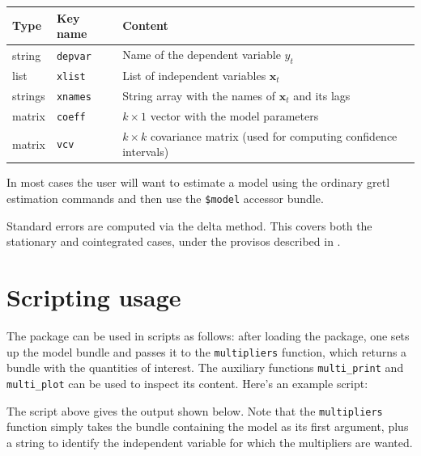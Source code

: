 \documentclass[a4paper,10pt]{article}
\newcommand{\xb}{\mathbf{x}}
\begin{document}
\medskip
\begin{center}
\begin{tabular}{llp{}}
  \hline
  \textbf{Type} & \textbf{Key name} & \textbf{Content} \\
  \hline
  string & \texttt{depvar} & Name of the dependent variable $y_t$ \\ 
  list & \texttt{xlist} & List of independent variables
                          $\xb_t$ \\ 
  strings & \texttt{xnames} & String array with the names of $\xb_t$
                              and its lags \\ 
  matrix & \texttt{coeff} & $k \times 1$ vector with the model parameters   \\ 
  matrix & \texttt{vcv} & $k \times k$ covariance matrix (used for
                          computing confidence intervals) \\
  \hline
\end{tabular}
\end{center}

\medskip

In most cases the user will want to estimate a model using the ordinary
gretl estimation commands and then use the \verb|$model| accessor bundle.

Standard errors are computed via the delta method. This covers both
the stationary and cointegrated cases, under the provisos described in
\cite{PesaranShin1998}.

\section{Scripting usage}
\label{sec:scripting}

The package can be used in scripts as follows: after loading the
package, one sets up the model bundle and passes it to the
\texttt{multipliers} function, which returns a bundle with the
quantities of interest. The auxiliary functions \texttt{multi\_print}
and \texttt{multi\_plot} can be used to inspect its content. Here's an
example script:

The script above gives the output shown below. Note that the
\texttt{multipliers} function simply takes the bundle containing the
model as its first argument, plus a string to identify the independent
variable for which the multipliers are wanted.
\end{document}
